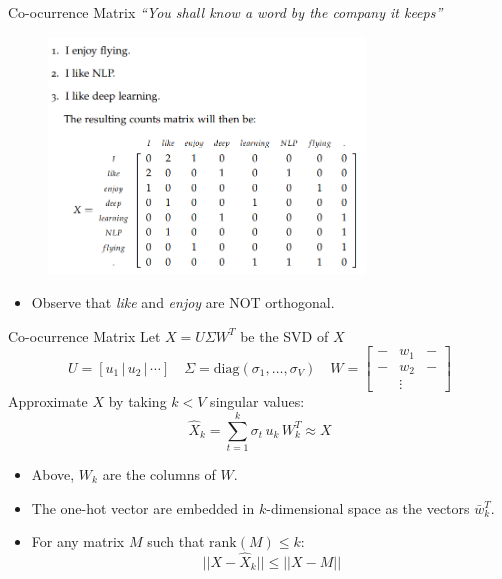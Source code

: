 \documentclass[9pt]{beamer}
\newcommand{\given}{\, | \,}
\newcommand{\diag}{\text{diag}}
\begin{document}
\begin{frame}{Co-ocurrence Matrix}
    \textit{``You shall know a word by the company it keeps''}\\[4mm]
    \hspace*{}
    \begin{figure}[c]
    \includegraphics[width=0.75\textwidth]{coocurrence_matrix.png}
    \end{figure}
    \begin{itemize}
        \item Observe that \textit{like} and \textit{enjoy} are NOT orthogonal.
    \end{itemize}
\end{frame}

\begin{frame}{Co-ocurrence Matrix}
Let $X = U\Sigma W^T$ be the SVD of $X$
    $$ U = [u_1 \given u_2\given \cdots ]\quad \Sigma = \diag(\sigma_1,\ldots, \sigma_V)\quad W = \begin{bmatrix}-& w_1&- \\-& w_2&- \\ &\vdots& \end{bmatrix}$$
        Approximate $X$ by taking $k<V$ singular values:
        $$\hat X_k = \sum_{t=1}^k \sigma_t\, u_k\, W_k^T\approx X$$
        \begin{itemize}
                \item Above, $W_k$ are the columns of $W$.
        \item The one-hot vector are embedded in $k$-dimensional space as the vectors $\bar w_k^T$.
        \item For any matrix $M$ such that $\text{rank}(M) \leq k$:
                $$|| X - \hat X_k || \leq || X - M ||$$
        \end{itemize}
\end{frame}
\end{document}
